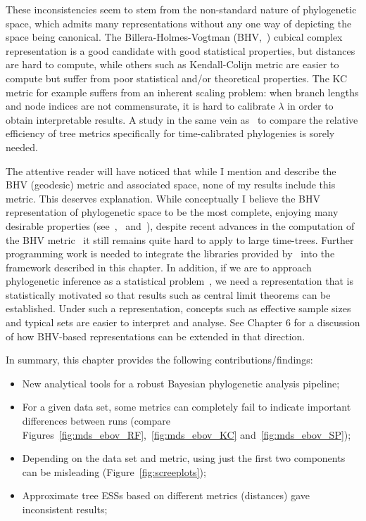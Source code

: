 These inconsistencies seem to stem from the non-standard nature of phylogenetic space, which admits many representations without any one way of depicting the space being canonical.
The Billera-Holmes-Vogtman (BHV,~\cite{Billera2001}) cubical complex representation is a good candidate with good statistical properties, but distances are hard to compute, while others such as Kendall-Colijn metric are easier to compute but suffer from poor statistical and/or theoretical properties.
The KC metric for example suffers from an inherent scaling problem: when branch lengths and node indices are not commensurate, it is hard to calibrate $\lambda$ in order to obtain interpretable results.
A study in the same vein as~\cite{Kuhner2014} to compare the relative efficiency of tree metrics specifically for time-calibrated phylogenies is sorely needed.

The attentive reader will have noticed that while I mention and describe the BHV (geodesic) metric and associated space, none of my results include this metric.
This deserves explanation.
While conceptually I believe the BHV representation of phylogenetic space to be the most complete, enjoying many desirable properties (see~\cite{Billera2001},~\cite{StJohn2017} and~\cite{Dinh2016}), despite recent advances in the computation of the BHV metric~\citep{Owen2011} it still remains quite hard to apply to large time-trees.
Further programming work is needed to integrate the libraries provided by~\citep{Owen2011} into the framework described in this chapter.
In addition, if we are to approach phylogenetic inference as a statistical problem~\citep{Holland2013}, we need a representation that is statistically motivated so that results such as central limit theorems can be established.
Under such a representation, concepts such as effective sample sizes and typical sets are easier to interpret and analyse.
See Chapter 6 for a discussion of how BHV-based representations can be extended in that direction.

In summary, this chapter provides the following contributions/findings:
\begin{itemize}
 \item New analytical tools for a robust Bayesian phylogenetic analysis pipeline;
 \item For a given data set, some metrics can completely fail to indicate important differences between runs (compare Figures~\ref{fig:mds_ebov_RF},~\ref{fig:mds_ebov_KC} and~\ref{fig:mds_ebov_SP});
 \item Depending on the data set and metric, using just the first two components can be misleading (Figure~\ref{fig:screeplots});
 \item Approximate tree ESSs based on different metrics (distances) gave inconsistent results;
\end{itemize}


